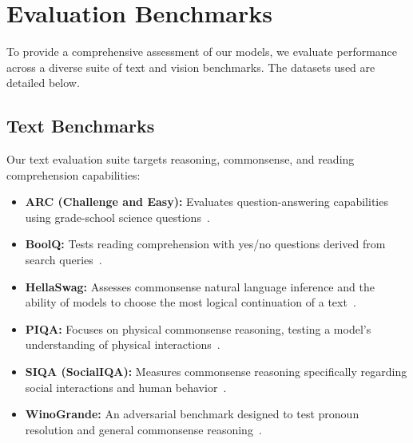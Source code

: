\documentclass[11pt, a4paper, twocolumn, copyright, google]{google}
\begin{document}
\section{Evaluation Benchmarks}
\label{sec:appendix_evals}

To provide a comprehensive assessment of our models, we evaluate performance across a diverse suite of text and vision benchmarks. The datasets used are detailed below.

\subsection{Text Benchmarks}
Our text evaluation suite targets reasoning, commonsense, and reading comprehension capabilities:
\begin{itemize}
    \item \textbf{ARC (Challenge and Easy):} Evaluates question-answering capabilities using grade-school science questions~\citep{clark2018think}.
    \item \textbf{BoolQ:} Tests reading comprehension with yes/no questions derived from search queries~\citep{clark-etal-2019-boolq}.
    \item \textbf{HellaSwag:} Assesses commonsense natural language inference and the ability of models to choose the most logical continuation of a text~\citep{zellers-etal-2019-hellaswag}.
    \item \textbf{PIQA:} Focuses on physical commonsense reasoning, testing a model's understanding of physical interactions~\citep{bisk2020piqa}.
    \item \textbf{SIQA (SocialIQA):} Measures commonsense reasoning specifically regarding social interactions and human behavior~\citep{sap-etal-2019-social-iqa}.
    \item \textbf{WinoGrande:} An adversarial benchmark designed to test pronoun resolution and general commonsense reasoning~\citep{sakaguchi2020winogrande}.
\end{itemize}
\end{document}
